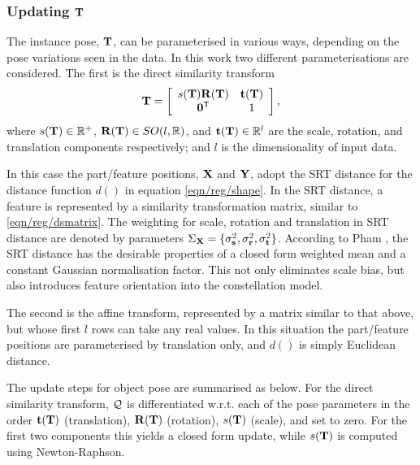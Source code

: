 \subsubsection{Updating $\mathbf{T}$}
The instance pose, $\mathbf{T}$, can be parameterised in various ways, depending on the pose variations seen in the data. In this work two different parameterisations are considered. The first is the direct similarity transform
\begin{equation}
	\mathbf{T}=\left[\begin{array}{cc}
			s(\mathbf{T})\mathbf{R}(\mathbf{T}) & \mathbf{t}(\mathbf{T})\\
		\mathbf{0}^{\textsf{T}} & 1\end{array}\right],
	\label{eqn/reg/dsmatrix}
\end{equation}
where $s(\mathbf{T})\in\mathbb{R}^+$, $\mathbf{R}(\mathbf{T})\in SO(l,\mathbb{R})$, and $\mathbf{t}(\mathbf{T})\in\mathbb{R}^l$ are the scale, rotation, and translation components respectively; and $l$ is the dimensionality of input data. 

In this case the part/feature positions, $\mathbf{X}$ and $\mathbf{Y}$, adopt the SRT distance \cite{Pham2011} for the distance function $d()$ in equation \ref{eqn/reg/shape}. In the SRT distance, a feature is represented by a similarity transformation matrix, similar to \ref{eqn/reg/dsmatrix}. The weighting for scale, rotation and translation in SRT distance are denoted by parameters ${\Sigma_{\mathbf{X}}} = \{{\sigma^{2}_{\mathbf{s}}}, {\sigma^{2}_{\mathbf{r}}}, {\sigma^{2}_{\mathbf{t}}}\}$.
According to Pham \etal \cite{Pham2011}, the SRT distance has the desirable properties of a closed form weighted mean and a constant Gaussian normalisation factor. This not only eliminates scale bias, but also introduces feature orientation into the constellation model.

The second is the affine transform, represented by a matrix similar to that above, but whose first $l$ rows can take any real values. In this situation the part/feature positions are parameterised by translation only, and $d()$ is simply Euclidean distance.

The update steps for object pose are summarised as below. 
For the direct similarity transform, $\mathcal{Q}$ is differentiated w.r.t. each of the pose parameters in the order $\mathbf{t}(\mathbf{T})$ (translation), $\mathbf{R}(\mathbf{T})$ (rotation), $s(\mathbf{T})$ (scale), and set to zero. For the first two components this yields a closed form update, while $s(\mathbf{T})$ is computed using Newton-Raphson. 

